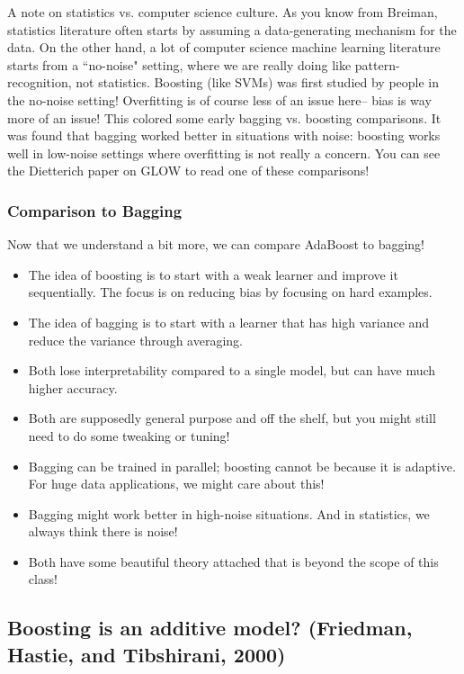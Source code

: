 A note on statistics vs. computer science culture. As you know from Breiman, statistics literature often starts by assuming a data-generating mechanism for the data. On the other hand, a lot of computer science machine learning literature starts from a ``no-noise" setting, where we are really doing like pattern-recognition, not statistics. Boosting (like SVMs) was first studied by people in the no-noise setting! Overfitting is of course less of an issue here-- bias is way more of an issue! This colored some early bagging vs. boosting comparisons. It was found that bagging worked better in situations with noise: boosting works well in low-noise settings where overfitting is not really a concern. You can see the Dietterich paper on GLOW to read one of these comparisons!



\subsubsection{Comparison to Bagging}

Now that we understand a bit more, we can compare AdaBoost to bagging!
\begin{itemize}
\item The idea of boosting is to start with a weak learner and improve it sequentially. The focus is on reducing bias by focusing on hard examples. 
\item The idea of bagging is to start with a learner that has high variance and reduce the variance through averaging. 
\item Both lose interpretability compared to a single model, but can have much higher accuracy.
\item Both are supposedly general purpose and off the shelf, but you might still need to do some tweaking or tuning!
\item Bagging can be trained in parallel; boosting cannot be because it is adaptive. For huge data applications, we might care about this!
\item Bagging might work better in high-noise situations. And in statistics, we always think there is noise!
\item Both have some beautiful theory attached that is beyond the scope of this class!
\end{itemize}

\subsection{Boosting is an additive model? (Friedman, Hastie, and Tibshirani, 2000)}

